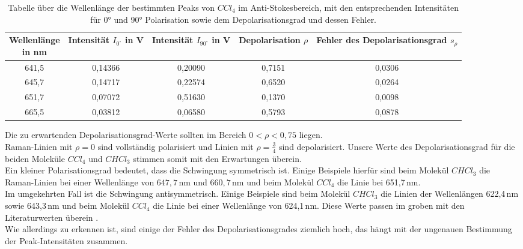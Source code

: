 \begin{table}[h]
  \centering
    \begin{tabular}{c||c|c|c|c}
      \makecell{Wellenlänge\\ in nm} & Intensität $I_{0^{\circ}}$ in V & Intensität $I_{90^{\circ}}$ in V & Depolarisation $\rho$ & \makecell{Fehler des \\ Depolarisationsgrad $s_{\rho}$} \\
      \hline  
      641,5 & 0,14366 & 0,20090 & 0,7151 & 0,0306 \\
      645,7 & 0,14717 & 0,22574 & 0,6520 & 0,0264 \\
      651,7 & 0,07072 & 0,51630 & 0,1370 & 0,0098 \\
      665,5 & 0,03812 & 0,06580 & 0,5793 & 0,0878 \\
    \end{tabular}%
    \caption{Tabelle über die Wellenlänge der bestimmten Peaks von $CCl_4$ im Anti-Stokesbereich, mit den entsprechenden Intensitäten für 0° und 90° Polarisation sowie dem Depolarisationsgrad und dessen Fehler. }
  \end{table}
\newpage
Die zu erwartenden Depolarisationsgrad-Werte sollten im Bereich $0 < \rho < 0,75$ liegen.\\
Raman-Linien mit $\rho = 0$ sind vollständig polarisiert und Linien mit 
$\rho = \frac{3}{4}$ sind depolarisiert. Unsere Werte des Depolarisationsgrad für die beiden Moleküle 
$CCl_4$ und $CHCl_3$ stimmen somit mit den Erwartungen überein.  \\
Ein kleiner Polarisationsgrad bedeutet, dass die Schwingung symmetrisch ist. Einige Beispiele hierfür
sind beim Molekül $CHCl_3$ die Raman-Linien bei einer Wellenlänge von $647,7\,$nm und $660,7$\,nm 
und beim Molekül $CCl_4$ die Linie bei 
651,7\,nm. \\
Im umgekehrten Fall ist die Schwingung antisymmetrisch. Einige Beispiele sind
beim Molekül $CHCl_3$ die Linien der Wellenlängen 622,4\,nm sowie 643,3\,nm und beim Molekül 
$CCl_4$ die Linie bei einer Wellenlänge von 624,1\,nm.
Diese Werte passen im groben mit den Literaturwerten überein \citep[vgl.][]{zusatzliteratur}.\\
Wie allerdings zu erkennen ist, sind einige der Fehler des Depolarisationsgrades ziemlich hoch, das hängt mit der ungenauen Bestimmung
der Peak-Intensitäten zusammen.

